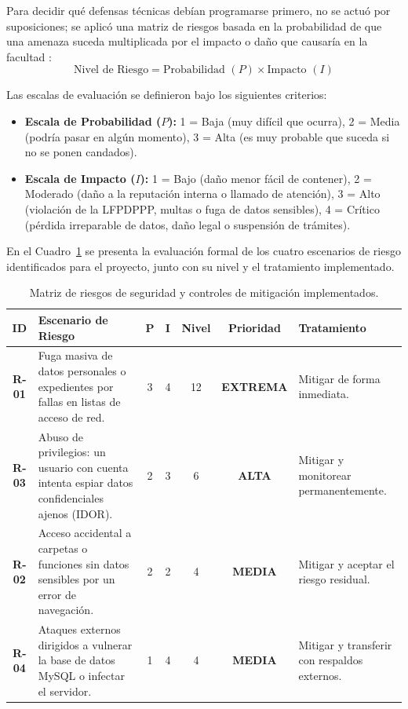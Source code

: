 Para decidir qué defensas técnicas debían programarse primero, no se actuó por suposiciones; se aplicó una matriz de riesgos basada en la probabilidad de que una amenaza suceda multiplicada por el impacto o daño que causaría en la facultad \parencite{ferraiolo2007}:
\begin{equation}
\text{Nivel de Riesgo} = \text{Probabilidad } (P) \times \text{Impacto } (I)
\end{equation}

Las escalas de evaluación se definieron bajo los siguientes criterios:
\begin{itemize}
    \item \textbf{Escala de Probabilidad ($P$):} 1 = Baja (muy difícil que ocurra), 2 = Media (podría pasar en algún momento), 3 = Alta (es muy probable que suceda si no se ponen candados).
    \item \textbf{Escala de Impacto ($I$):} 1 = Bajo (daño menor fácil de contener), 2 = Moderado (daño a la reputación interna o llamado de atención), 3 = Alto (violación de la LFPDPPP, multas o fuga de datos sensibles), 4 = Crítico (pérdida irreparable de datos, daño legal o suspensión de trámites).
\end{itemize}

En el Cuadro~\ref{tab:matriz_riesgos_sistema} se presenta la evaluación formal de los cuatro escenarios de riesgo identificados para el proyecto, junto con su nivel y el tratamiento implementado.

\begin{table}[H]
\centering
\small
\singlespacing
\caption{Matriz de riesgos de seguridad y controles de mitigación implementados.}
\label{tab:matriz_riesgos_sistema}
\begin{tabular}{c p{5.3cm} c c c c p{2.8cm}}
\toprule
\textbf{ID} & \textbf{Escenario de Riesgo} & \textbf{P} & \textbf{I} & \textbf{Nivel} & \textbf{Prioridad} & \textbf{Tratamiento} \\
\midrule
\textbf{R-01} & 
Fuga masiva de datos personales o expedientes por fallas en listas de acceso de red. & 
3 & 4 & 12 & \textbf{EXTREMA} & Mitigar de forma inmediata. \\
\addlinespace
\textbf{R-03} & 
Abuso de privilegios: un usuario con cuenta intenta espiar datos confidenciales ajenos (IDOR). & 
2 & 3 & 6 & \textbf{ALTA} & Mitigar y monitorear permanentemente. \\
\addlinespace
\textbf{R-02} & 
Acceso accidental a carpetas o funciones sin datos sensibles por un error de navegación. & 
2 & 2 & 4 & \textbf{MEDIA} & Mitigar y aceptar el riesgo residual. \\
\addlinespace
\textbf{R-04} & 
Ataques externos dirigidos a vulnerar la base de datos MySQL o infectar el servidor. & 
1 & 4 & 4 & \textbf{MEDIA} & Mitigar y transferir con respaldos externos. \\
\bottomrule
\end{tabular}
\end{table}

